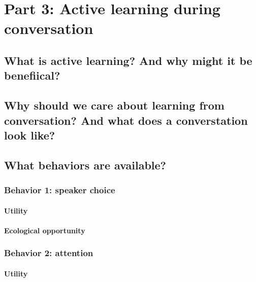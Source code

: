 \documentclass[a4paper,man,apacite,floatsintext]{apa6}
\begin{document}
\section{Part 3: Active learning during
conversation}\label{part-3-active-learning-during-conversation}

\subsection{What is active learning? And why might it be
benefiical?}\label{what-is-active-learning-and-why-might-it-be-benefiical}

\subsection{Why should we care about learning from conversation? And
what does a converstation look
like?}\label{why-should-we-care-about-learning-from-conversation-and-what-does-a-converstation-look-like}

\subsection{What behaviors are
available?}\label{what-behaviors-are-available}

\subsubsection{Behavior 1: speaker
choice}\label{behavior-1-speaker-choice}

\paragraph{Utility}\label{utility}

\paragraph{Ecological opportunity}\label{ecological-opportunity}

\subsubsection{Behavior 2: attention}\label{behavior-2-attention}

\paragraph{Utility}\label{utility-1}
\end{document}
